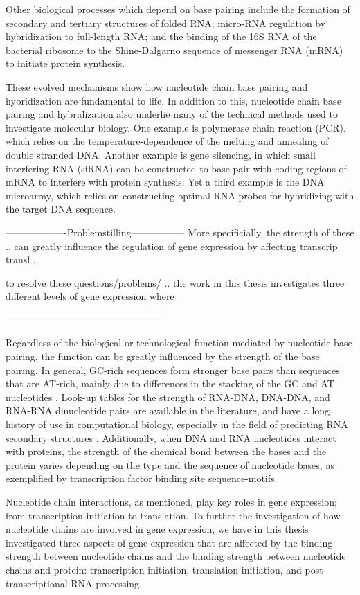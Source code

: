 Other biological processes which depend on base pairing include the formation
of secondary and tertiary structures of folded RNA; micro-RNA regulation by
hybridization to full-length RNA; and the binding of the 16S RNA of the
bacterial ribosome to the Shine-Dalgarno sequence of messenger RNA (mRNA) to
initiate protein synthesis.

These evolved mechanisms show how nucleotide chain base pairing and
hybridization are fundamental to life. In addition to this, nucleotide chain
base pairing and hybridization also underlie many of the technical methods used
to investigate molecular biology. One example is polymerase chain reaction
(PCR), which relies on the temperature-dependence of the melting and annealing
of double stranded DNA. Another example is gene silencing, in which small
interfering RNA (siRNA) can be constructed to base pair with coding regions of
mRNA to interfere with protein synthesis. Yet a third example is the DNA
microarray, which relies on constructing optimal RNA probes for hybridizing
with the target DNA sequence.

-------------------Problemstilling-----------------
More specificially, the strength of these .. can greatly influence the
regulation of gene expression by affecting transcrip transl ..

to resolve these questions/problems/ .. the work in this thesis investigates
three different levels of gene expression where



---------------------------------------------------

Regardless of the biological or technological function mediated by nucleotide
base pairing, the function can be greatly influenced by the strength of the
base pairing. In general, GC-rich sequences form stronger base pairs than
sequences that are AT-rich, mainly due to differences in the stacking of the GC
and AT nucleotides \cite{yakovchuk_base-stacking_2006}. Look-up tables for the
strength of RNA-DNA, DNA-DNA, and RNA-RNA dinucleotide pairs are available in
the literature, and have a long history of use in computational biology,
especially in the field of predicting RNA secondary structures
\cite{mathews_prediction_2006}. Additionally, when DNA and RNA nucleotides
interact with proteins, the strength of the chemical bond between the bases and
the protein varies depending on the type and the sequence of nucleotide bases,
as exemplified by transcription factor binding site sequence-motifs.

Nucleotide chain interactions, as mentioned, play key roles in gene expression;
from transcription initiation to translation. To further the investigation of
how nucleotide chains are involved in gene expression, we have in this thesis
investigated three aspects of gene expression that are affected by the binding
strength between nucleotide chains and the binding strength between nucleotide
chains and protein: transcription initiation, translation initiation, and
post-transcriptional RNA processing.

